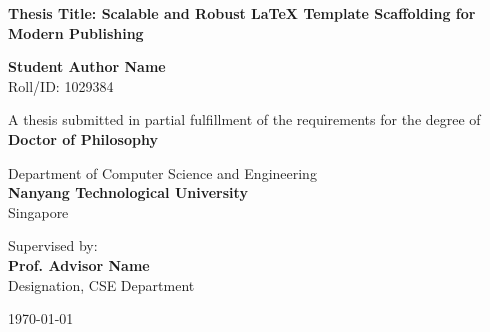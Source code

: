 \begin{titlepage}
\begin{center}
    \vspace*{1cm}
    
    
    \vspace{1.5cm}
    
    {\huge \bfseries \color{primary} Thesis Title: Scalable and Robust LaTeX Template Scaffolding for Modern Publishing}
    
    \vspace{1.5cm}
    
    {\Large \bfseries Student Author Name} \\
    \vspace{0.2cm}
    {Roll/ID: 1029384}
    
    \vspace{1.5cm}
    
    {A thesis submitted in partial fulfillment of the requirements for the degree of} \\
    \vspace{0.3cm}
    {\large \bfseries \color{secondary} Doctor of Philosophy}
    
    \vspace{1.5cm}
    
    {\large Department of Computer Science and Engineering} \\
    \vspace{0.2cm}
    {\large \bfseries \color{primary} Nanyang Technological University} \\
    \vspace{0.1cm}
    {Singapore}
    
    \vfill
    
    {Supervised by:} \\
    {\large \bfseries Prof. Advisor Name} \\
    {Designation, CSE Department}
    
    \vspace{1cm}
    
    {\large \today}
    
\end{center}
\end{titlepage}
